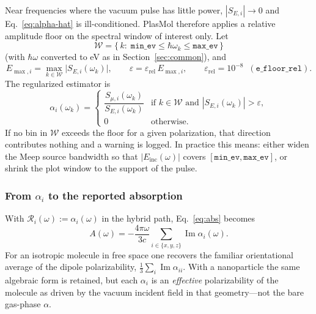 \documentclass[11pt,a4paper]{article}
\begin{document}
Near frequencies where the vacuum pulse has little power,
$|S_{E,i}|\to 0$ and Eq.~\eqref{eq:alpha-hat} is ill-conditioned.
PlasMol therefore applies a relative amplitude floor on the spectral
window of interest only.  Let
\begin{equation}
  \mathcal{W}
  =
  \big\{\, k :\;
    \texttt{min\_ev}
    \le
    \hbar\omega_k
    \le
    \texttt{max\_ev}
  \,\big\}
\end{equation}
(with $\hbar\omega$ converted to eV as in Section~\ref{sec:common}), and
\begin{equation}
  E_{\max,i}
  =
  \max_{k\in\mathcal{W}}
  \big|S_{E,i}(\omega_k)\big|,
  \qquad
  \varepsilon
  =
  \varepsilon_{\mathrm{rel}}\, E_{\max,i},
  \qquad
  \varepsilon_{\mathrm{rel}} = 10^{-8}
  \;\;(\texttt{e\_floor\_rel}).
\end{equation}
The regularized estimator is
\begin{equation}
  \alpha_i(\omega_k)
  =
  \begin{cases}
    \displaystyle
    \dfrac{S_{\mu,i}(\omega_k)}{S_{E,i}(\omega_k)}
      & \text{if } k\in\mathcal{W}
           \text{ and }
           |S_{E,i}(\omega_k)| > \varepsilon, \\[0.8em]
    0
      & \text{otherwise}.
  \end{cases}
  \label{eq:alpha}
\end{equation}
If no bin in $\mathcal{W}$ exceeds the floor for a given polarization,
that direction contributes nothing and a warning is logged.  In practice
this means: either widen the Meep source bandwidth so that
$|E_{\mathrm{inc}}(\omega)|$ covers $[\texttt{min\_ev},\texttt{max\_ev}]$,
or shrink the plot window to the support of the pulse.

\subsubsection{From \texorpdfstring{$\alpha_i$}{alpha} to the reported absorption}

With $\mathcal{R}_i(\omega) := \alpha_i(\omega)$ in the hybrid path,
Eq.~\eqref{eq:abs} becomes
\begin{equation}
  A(\omega)
  =
  -\frac{4\pi\omega}{3c}
  \sum_{i\in\{x,y,z\}}
  \operatorname{Im}\alpha_i(\omega).
  \label{eq:abs-hybrid}
\end{equation}
For an isotropic molecule in free space one recovers the familiar
orientational average of the dipole polarizability,
$\tfrac13\sum_i\operatorname{Im}\alpha_{ii}$.  With a nanoparticle the
same algebraic form is retained, but each $\alpha_i$ is an
\emph{effective} polarizability of the molecule as driven by the vacuum
incident field in that geometry---not the bare gas-phase $\alpha$.
\end{document}
